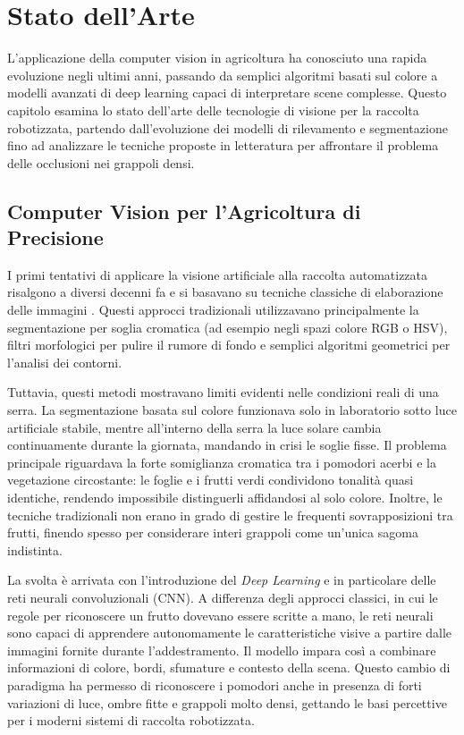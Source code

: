\chapter{Stato dell'Arte}
\label{chap:stato_arte}

L'applicazione della computer vision in agricoltura ha conosciuto una rapida 
evoluzione negli ultimi anni, passando da semplici algoritmi basati sul colore a 
modelli avanzati di deep learning capaci di interpretare scene complesse. 
Questo capitolo esamina lo stato dell'arte delle tecnologie di visione per la raccolta 
robotizzata, partendo dall'evoluzione dei modelli di rilevamento e segmentazione 
fino ad analizzare le tecniche proposte in letteratura per affrontare il problema 
delle occlusioni nei grappoli densi.


\section{Computer Vision per l'Agricoltura di Precisione}
\label{sec:cv_agricoltura}

I primi tentativi di applicare la visione artificiale alla raccolta automatizzata 
risalgono a diversi decenni fa e si basavano su tecniche classiche di elaborazione 
delle immagini \cite{gongal2015sensors}. Questi approcci tradizionali utilizzavano 
principalmente la segmentazione per soglia cromatica (ad esempio negli spazi colore 
RGB o HSV), filtri morfologici per pulire il rumore di fondo e semplici algoritmi 
geometrici per l'analisi dei contorni.

Tuttavia, questi metodi mostravano limiti evidenti nelle condizioni reali di una serra. 
La segmentazione basata sul colore funzionava solo in laboratorio sotto luce artificiale 
stabile, mentre all'interno della serra la luce solare cambia continuamente durante la 
giornata, mandando in crisi le soglie fisse. Il problema principale riguardava la forte 
somiglianza cromatica tra i pomodori acerbi e la vegetazione circostante: le foglie e i 
frutti verdi condividono tonalità quasi identiche, rendendo impossibile distinguerli 
affidandosi al solo colore. Inoltre, le tecniche tradizionali non erano in grado di 
gestire le frequenti sovrapposizioni tra frutti, finendo spesso per considerare interi 
grappoli come un'unica sagoma indistinta.

La svolta è arrivata con l'introduzione del \textit{Deep Learning} e in particolare 
delle reti neurali convoluzionali (CNN). A differenza degli approcci classici, in cui le 
regole per riconoscere un frutto dovevano essere scritte a mano, le reti neurali sono 
capaci di apprendere autonomamente le caratteristiche visive a partire dalle immagini 
fornite durante l'addestramento. Il modello impara così a combinare informazioni di colore, 
bordi, sfumature e contesto della scena. Questo cambio di paradigma ha permesso di 
riconoscere i pomodori anche in presenza di forti variazioni di luce, ombre fitte e 
grappoli molto densi, gettando le basi percettive per i moderni sistemi di raccolta robotizzata.

